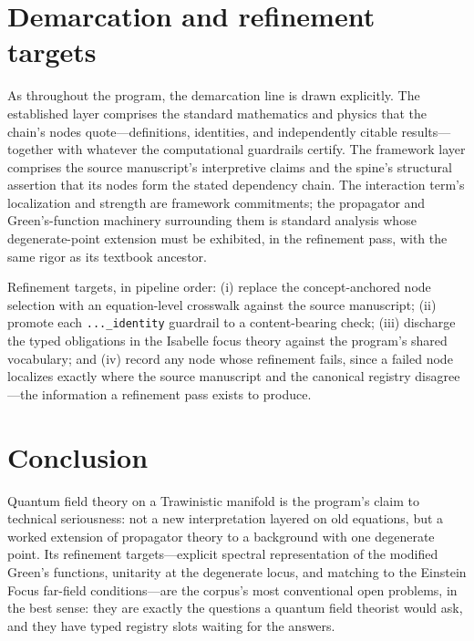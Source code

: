 \documentclass[11pt]{article}
\theoremstyle{remark}
\begin{document}
\section{Demarcation and refinement targets}
\label{sec:demarc}

As throughout the program, the demarcation line is drawn explicitly. The established layer comprises the standard mathematics and physics that the chain's nodes quote---definitions, identities, and independently citable results---together with whatever the computational guardrails certify. The framework layer comprises the source manuscript's interpretive claims and the spine's structural assertion that its nodes form the stated dependency chain. The interaction term's localization and strength are framework commitments; the propagator and Green's-function machinery surrounding them is standard analysis whose degenerate-point extension must be exhibited, in the refinement pass, with the same rigor as its textbook ancestor.

Refinement targets, in pipeline order: (i) replace the concept-anchored node selection with an equation-level crosswalk against the source manuscript; (ii) promote each \texttt{...\_identity} guardrail to a content-bearing check; (iii) discharge the typed obligations in the Isabelle focus theory against the program's shared vocabulary; and (iv) record any node whose refinement fails, since a failed node localizes exactly where the source manuscript and the canonical registry disagree---the information a refinement pass exists to produce.

\section{Conclusion}
\label{sec:conc}

Quantum field theory on a Trawinistic manifold is the program's claim to technical seriousness: not a new interpretation layered on old equations, but a worked extension of propagator theory to a background with one degenerate point. Its refinement targets---explicit spectral representation of the modified Green's functions, unitarity at the degenerate locus, and matching to the Einstein Focus far-field conditions---are the corpus's most conventional open problems, in the best sense: they are exactly the questions a quantum field theorist would ask, and they have typed registry slots waiting for the answers.
\end{document}
